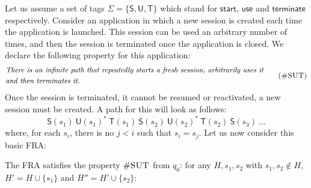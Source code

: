 \begin{example}\label{example:sessions}
Let us assume a set of tags $\Sigma = \{\mathsf{S}, \mathsf{U}, \mathsf{T}\}$ which stand for $\mathsf{start}$, $\mathsf{use}$ and $\mathsf{terminate}$ respectively.
Consider an application in which a new session is created each time the application is launched.
This session can be used an arbitrary number of times, and then the session is terminated once the application is closed. 
We declare the following property for this application:
\[\begin{aligned}
	&\text{\em There is an infinite path that repeatedly starts a fresh session, arbitrarily uses it}\\
	&\text{\em and then terminates it.}
\end{aligned}\tag{\textsc{\#SUT}}\]
Once the session is terminated, it cannot be resumed or reactivated, a new session must be created.
A path for this will look as follows:
\[
	\mathsf{S}(s_1)\ \mathsf{U}(s_1)^*\ \mathsf{T}(s_1)\ \mathsf{S}(s_2)\ \mathsf{U}(s_2)^*\ \mathsf{T}(s_2)\ \mathsf{S}(s_3)\ \dots 
\]
where, for each $s_i$, there is no $j < i$ such that $s_i = s_j$.
Let us now consider this basic FRA:

\begin{centering}
\end{centering}

\noindent
The FRA satisfies the property $\textsc{\#SUT}$ from $q_0$: for any $H, s_1,s_2$ with $s_1,s_2\notin H$, $H'=H\cup\{s_1\}$ and $H'' = H' \cup \{s_2\}$:


\end{example}
